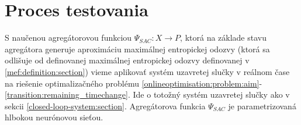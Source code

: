 

\section{Proces testovania}
\label{testing:process}
S naučenou agregátorovou funkciou $\Psi_{SAC}: X \rightarrow P$, ktorá na základe stavu agregátora generuje aproximáciu maximálnej entropickej odozvy (ktorá sa odlišuje od definovanej maximálnej entropickej odozvy definovanej v \ref{mef:definition:section}) vieme aplikovať systém uzavretej slučky v reálnom čase na riešenie optimalizačného problému \eqref{onlineoptimisation:problem:aim}-\eqref{transition:remaining_timechange}. Ide o totožný systém uzavretej slučky ako v sekcii \ref{closed-loop-system:section}. Agregátorova funkcia $\Psi_{SAC}$ je parametrizovaná hlbokou neurónovou sieťou.




